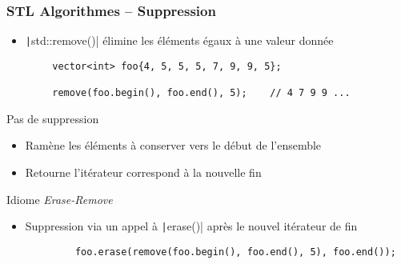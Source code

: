 \documentclass[C++.tex]{subfiles}
\begin{document}
\begin{frame}[fragile]
	\frametitle{STL Algorithmes -- Suppression}
	\begin{itemize}
		\item \texttt|std::remove()| élimine les éléments égaux à une valeur donnée
	\end{itemize}

	\begin{verbatim}
		vector<int> foo{4, 5, 5, 5, 7, 9, 9, 5};

		remove(foo.begin(), foo.end(), 5);    // 4 7 9 9 ...
	\end{verbatim}

	\begin{alertblock}{Pas de suppression}
		\begin{itemize}
			\item Ramène les éléments à conserver vers le début de l'ensemble
			\item Retourne l'itérateur correspond à la nouvelle fin
		\end{itemize}
	\end{alertblock}


	\begin{block}{Idiome \textit{Erase-Remove}}
		\begin{itemize}
			\item Suppression via un appel à \texttt|erase()| après le nouvel itérateur de fin
		\end{itemize}

		\begin{verbatim}
			foo.erase(remove(foo.begin(), foo.end(), 5), foo.end());
		\end{verbatim}
	\end{block}
\end{frame}
\end{document}
